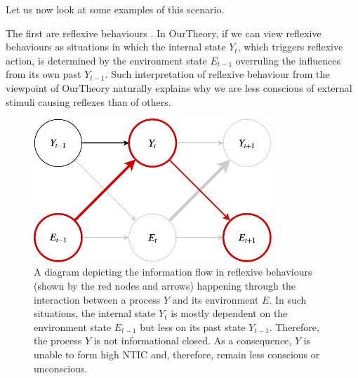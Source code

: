 \documentclass[utf8]{article}
\begin{document}
         
                

                Let us now look at some examples of this scenario. 
                
               The first are reflexive behaviours \citep{casali2013theoretically}. 
               In \ac{OurTheory}, if we can view reflexive behaviours as situations in which the internal state $Y_t$, which triggers reflexive action, is determined by the environment state $E_{t-1}$ overruling the influences from its own past $Y_{t-1}$.  Such interpretation of reflexive behaviour from the viewpoint of \ac{OurTheory} naturally explains why we are less conscious of external stimuli causing reflexes than of others. 

        		\begin{figure}[H]
        			\includegraphics[width=0.8\textwidth]{WritingMaterials/Fig_Reflexive/Reflexive.pdf}
        			\caption{
        			    A diagram depicting the information flow in reflexive behaviours (shown by the red nodes and arrows) happening through the interaction between a process $Y$ and its environment $E$. In such situations, the internal state $Y_t$ is mostly dependent on the environment state $E_{t-1}$ but less on its past state $Y_{t-1}$. Therefore, the process $Y$ is not informational closed. As a  consequence, $Y$ is unable to form high NTIC and, therefore, remain less conscious or unconscious. 
        			    }
        			\label{fig:reflexive}
        		\end{figure}  
        		
\end{document}
